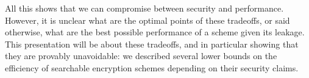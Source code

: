 All this shows that we can compromise between security and performance. 
However, it is unclear what are the optimal points of these tradeoffs, or said otherwise, what are the best possible performance of a scheme given its leakage.
This presentation will be about these tradeoffs, and in particular showing that they are provably unavoidable: we described several lower bounds on the efficiency of searchable encryption schemes depending on their security claims. 

%




